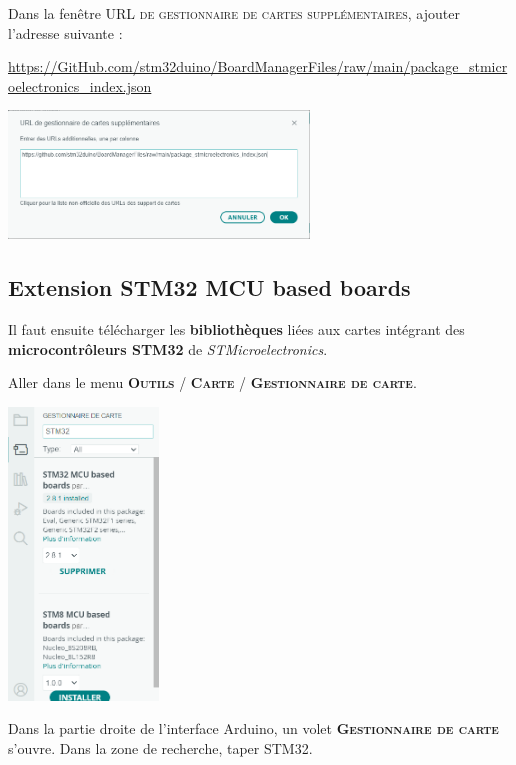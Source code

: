 \documentclass[a4paper,11pt,titlepage]{article} %
\begin{document}
Dans la fenêtre \textsc{URL de gestionnaire de cartes supplémentaires}, ajouter l'adresse suivante :

\href{https://GitHub.com/stm32duino/BoardManagerFiles/raw/main/package_stmicroelectronics_index.json}{https://GitHub.com/stm32duino/BoardManagerFiles/raw/main/package\_stmicroelectronics\_index.json}

\begin{center}
	\includegraphics[width=0.6\textwidth]{images/arduino_preferences_url.png}
\end{center}

\subsection{Extension STM32 MCU based boards}

Il faut ensuite télécharger les \textbf{bibliothèques} liées aux cartes intégrant des \textbf{microcontrôleurs STM32} de \textit{STMicroelectronics}.

Aller dans le menu \textsc{\textbf{Outils} / \textbf{Carte} / \textbf{Gestionnaire de carte}}. 

\begin{center}
	\includegraphics[width=0.3\textwidth]{images/arduino_gestion_cartes.png}
\end{center}

Dans la partie droite de l'interface Arduino, un volet \textsc{\textbf{Gestionnaire de carte}} s'ouvre. Dans la zone de recherche, taper STM32.
\end{document}
